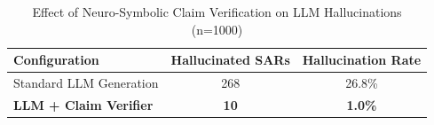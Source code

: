 \begin{table}[!t]
\centering
\caption{Effect of Neuro-Symbolic Claim Verification on LLM Hallucinations (n=1000)}
\label{tab:hallucinations}
\begin{tabular}{lcc}
\toprule
\textbf{Configuration} & \textbf{Hallucinated SARs} & \textbf{Hallucination Rate} \\
\midrule
Standard LLM Generation & 268 & 26.8\% \\
\textbf{LLM + Claim Verifier} & \textbf{10} & \textbf{1.0\%} \\
\bottomrule
\end{tabular}
\end{table}
